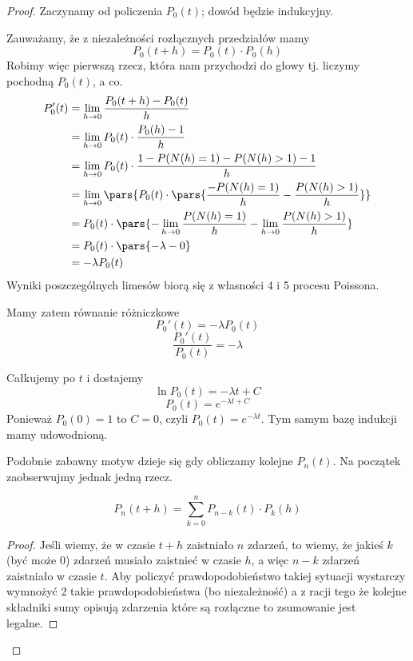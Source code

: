 \begin{proof}
    Zaczynamy od policzenia \( P_0(t) \); dowód będzie indukcyjny.
    
    Zauważamy, że z niezależności rozłącznych przedziałów mamy
    \[
        P_0(t + h) = P_0(t) \cdot P_0(h)
    \]
    Robimy więc pierwszą rzecz, która nam przychodzi do głowy tj. liczymy pochodną \( P_0(t) \), a co.
    \begin{align*}
        P_0'(t)
            &= \lim_{h \rightarrow 0} \frac{P_0(t + h) - P_0(t)}{h} \\
            &= \lim_{h \rightarrow 0} P_0(t) \cdot \frac{P_0(h) - 1}{h} \\
            &= \lim_{h \rightarrow 0} P_0(t) \cdot \frac{1 - P(N(h) = 1) - P(N(h)  > 1) - 1}{h} \\
            &= \lim_{h \rightarrow 0} \pars{ P_0(t) \cdot \pars{ \frac{- P(N(h) = 1)}{h} - \frac{P(N(h) > 1)}{h}}} \\
            &= P_0(t) \cdot \pars{-\lim_{h \rightarrow 0} \frac{P(N(h) = 1)}{h} - \lim_{h \rightarrow 0} \frac{P(N(h) > 1)}{h}} \\
            &= P_0(t) \cdot \pars{-\lambda - 0} \\ 
            &= -\lambda P_0(t)
    \end{align*}
    Wyniki poszczególnych limesów biorą się z własności 4 i 5 procesu Poissona.
    
    Mamy zatem równanie różniczkowe
    \[
        P_0'(t) = -\lambda P_0(t)
    \]
    \[
        \frac{P_0'(t)}{P_0(t)} = -\lambda
    \]
    
    Całkujemy po \( t \) i dostajemy
    \[
        \ln P_0(t) = -\lambda t + C
    \]
    \[
        P_0(t) = e^{-\lambda t + C}
    \]
    Ponieważ \( P_0(0) = 1 \) to \( C = 0\), czyli \( P_0(t) = e^{-\lambda t} \). Tym samym bazę indukcji mamy udowodnioną.
    
    Podobnie zabawny motyw dzieje się gdy obliczamy kolejne \( P_n(t) \). Na początek zaobserwujmy jednak jedną rzecz. 
    
    \begin{fact} 
        \[ P_{n}(t+h) = \sum_{k=0}^{n} P_{n-k}(t) \cdot P_k(h) \]
    \end{fact}
    \begin{proof}
        Jeśli wiemy, że w czasie \(t + h\) zaistniało \(n\) zdarzeń, to wiemy, że jakieś \(k\) (być może \(0\)) zdarzeń musiało zaistnieć w czasie \(h\), a więc \(n - k\) zdarzeń zaistniało w czasie \(t\). Aby policzyć prawdopodobieństwo takiej sytuacji wystarczy wymnożyć 2 takie prawdopodobieństwa (bo niezależność) a z racji tego że kolejne składniki sumy opisują zdarzenia które są rozłączne to zsumowanie jest legalne. 
    \end{proof}
    

\end{proof}
